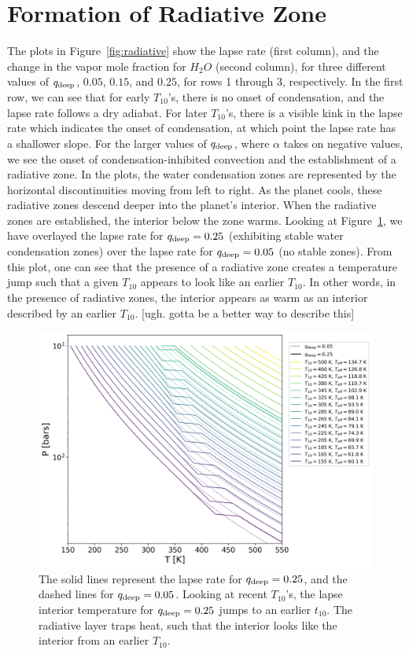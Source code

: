 \documentclass[11pt]{ucscthesisbs}
\begin{document}
\section{Formation of Radiative Zone}
The plots in Figure~\ref{fig:radiative} show the lapse rate (first column), and the change in the vapor mole fraction for $H_{2}O$ (second column), for three different values of $q_{\rm deep}$, $0.05$, $0.15$, and $0.25$, for rows 1 through 3, respectively. In the first row, we can see that for early $T_{10}$'s, there is no onset of condensation, and the lapse rate follows a dry adiabat. For later $T_{10}$'s, there is a visible kink in the lapse rate which indicates the onset of condensation, at which point the lapse rate has a shallower slope. For the larger values of $q_{\rm deep}$, where $\alpha$ takes on negative values, we see the onset of condensation-inhibited convection and the establishment of a radiative zone. In the plots, the water condensation zones are represented by the horizontal discontinuities moving from left to right. As the planet cools, these radiative zones descend deeper into the planet's interior. When the radiative zones are established, the interior below the zone warms. Looking at Figure~\ref{fig:overlay}, we have overlayed the lapse rate for $q_{\rm deep} = 0.25$ (exhibiting stable water condensation zones) over the lapse rate for $q_{\rm deep}=0.05$ (no stable zones). From this plot, one can see that the presence of a radiative zone creates a temperature jump such that a given $T_{10}$ appears to look like an earlier $T_{10}$. In other words, in the presence of radiative zones, the interior appears as warm as an interior described by an earlier $T_{10}$. [ugh. gotta be a better way to describe this]

\begin{figure}[ht]
 \centerline{
  \includegraphics[scale=0.7]{figures/thesis_static_radiative_layer_plot_diff_qdeep_overlay.png}
 }
\caption[Impact of Radiative Layer on T10]
{The solid lines represent the lapse rate for $q_{\rm deep} = 0.25$, and the dashed lines for $q_{\rm deep}=0.05$. Looking at recent $T_{10}$'s, the lapse interior temperature for $q_{\rm deep} = 0.25$ jumps to an earlier $t_{10}$. The radiative layer traps heat, such that the interior looks like the interior from an earlier $T_{10}$.}
\label{fig:overlay}
\end{figure}
\end{document}
